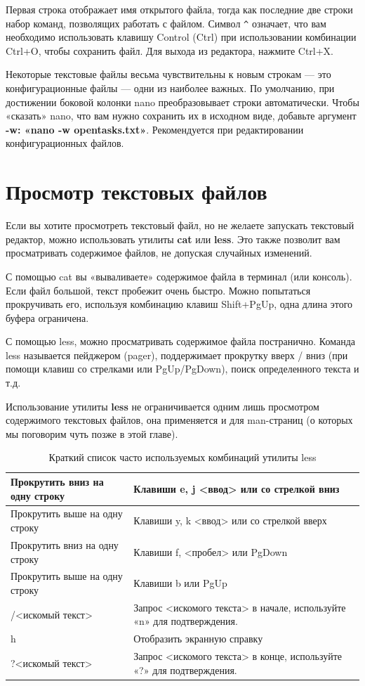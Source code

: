 \documentclass[10pt]{book}
\begin{document}
Первая строка отображает имя открытого файла, тогда как последние две строки набор команд, позволящих работать с файлом. Символ \verb|^| означает, что вам необходимо использовать клавишу Control (Ctrl) при использовании комбинации Ctrl+O, чтобы сохранить файл. Для выхода из редактора, нажмите Ctrl+X.

Некоторые текстовые файлы весьма чувствительны к новым строкам — это конфигурационные файлы — одни из наиболее важных. По умолчанию, при достижении боковой колонки nano преобразовывает строки автоматически. Чтобы «сказать» nano, что вам нужно сохранить их в исходном виде, добавьте аргумент \textbf{-w: «nano -w opentasks.txt»}. Рекомендуется при редактировании конфигурационных файлов.

\section{Просмотр текстовых файлов}

Если вы хотите просмотреть текстовый файл, но не желаете запускать текстовый редактор, можно использовать утилиты \textbf{cat} или \textbf{less}. Это также позволит вам просматривать содержимое файлов, не допуская случайных изменений.

С помощью cat вы «вываливаете» содержимое файла в терминал (или консоль). Если файл большой, текст пробежит очень быстро. Можно попытаться прокручивать его, используя комбинацию клавиш Shift+PgUp, одна длина этого буфера ограничена.

С помощью less, можно просматривать содержимое файла постранично. Команда less называется пейджером (pager), поддержимает прокрутку вверх / вниз (при помощи клавиш со стрелками или PgUp/PgDown), поиск определенного текста и т.д.

Использование утилиты \textbf{less} не ограничивается одним лишь просмотром содержимого текстовых файлов, она применяется и для man-страниц (о которых мы поговорим чуть позже в этой главе).

\vspace{-0.5cm}
\begin{table}[!h]
\caption{Краткий список часто используемых комбинаций утилиты less}
\begin{tabular}{|m{7cm}|m{9.5cm}|}
\hline
	Прокрутить вниз на одну строку & Клавиши e, j <ввод> или со стрелкой вниз\\
\hline
	\small{Прокрутить выше на одну строку} & Клавиши y, k <ввод> или со стрелкой вверх\\
\hline
	Прокрутить вниз на одну строку & Клавиши f, <пробел> или PgDown\\
\hline
	\small{Прокрутить выше на одну строку} & Клавиши b или PgUp\\
\hline
	/<искомый текст> & Запрос <искомого текста> в начале, используйте «n» для подтверждения.\\
\hline
	h & Отобразить экранную справку\\
\hline
	?<искомый текст> & Запрос <искомого текста> в конце, используйте «?» для подтверждения.\\
\hline
\end{tabular}
\end{table}
\end{document}
